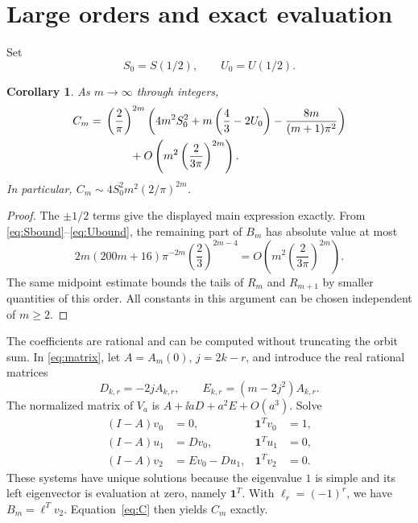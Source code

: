 \documentclass[11pt,a4paper]{article}
\newtheorem{corollary}[theorem]{Corollary}
\theoremstyle{remark}\newtheorem*{ednote}{Editorial note (ProveIt, 2026-10-01)}
\begin{document}
\section{Large orders and exact evaluation}
Set
\[
 S_0=S(1/2),\qquad U_0=U(1/2).
\]
\begin{corollary}\label{cor:large}
As $m\to\infty$ through integers,
\begin{align}
 C_m={}&\left(\frac2\pi\right)^{2m}
 \left(4m^2S_0^2+m\left(\frac43-2U_0\right)
                   -\frac{8m}{(m+1)\pi^2}\right)\notag\\
 &\hspace{8mm}+O\left(m^2\left(\frac{2}{3\pi}\right)^{2m}\right).
 \label{eq:largem}
\end{align}
In particular, $C_m\sim4S_0^2m^2(2/\pi)^{2m}$.
\end{corollary}
\begin{proof}
The $\pm1/2$ terms give the displayed main expression exactly. From \eqref{eq:Sbound}--\eqref{eq:Ubound}, the remaining part of $B_m$ has absolute value at most
\[
 2m(200m+16)\pi^{-2m}\left(\frac23\right)^{2m-4}
 =O\left(m^2\left(\frac{2}{3\pi}\right)^{2m}\right).
\]
The same midpoint estimate bounds the tails of $R_m$ and $R_{m+1}$ by smaller quantities of this order. All constants in this argument can be chosen independent of $m\ge2$.
\end{proof}

The coefficients are rational and can be computed without truncating the orbit sum. In \eqref{eq:matrix}, let $A=A_m(0)$, $j=2k-r$, and introduce the real rational matrices
\[
 D_{k,r}=-2jA_{k,r},\qquad E_{k,r}=(m-2j^2)A_{k,r}.
\]
The normalized matrix of $V_a$ is $A+\ii aD+a^2E+O(a^3)$. Solve
\begin{align*}
 (I-A)v_0&=0,&\mathbf1^Tv_0&=1,\\
 (I-A)u_1&=Dv_0,&\mathbf1^Tu_1&=0,\\
 (I-A)v_2&=Ev_0-Du_1,&\mathbf1^Tv_2&=0.
\end{align*}
These systems have unique solutions because the eigenvalue $1$ is simple and its left eigenvector is evaluation at zero, namely $\mathbf1^T$. With $\ell_r=(-1)^r$, we have $B_m=\ell^Tv_2$. Equation~\eqref{eq:C} then yields $C_m$ exactly.
\end{document}
